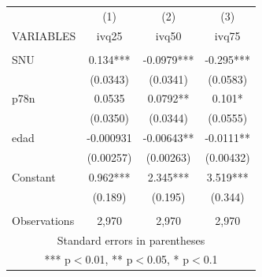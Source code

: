 \begin{tabular}{lccc} \hline
 & (1) & (2) & (3) \\
VARIABLES & ivq25 & ivq50 & ivq75 \\ \hline
 &  &  &  \\
SNU & 0.134*** & -0.0979*** & -0.295*** \\
 & (0.0343) & (0.0341) & (0.0583) \\
p78n & 0.0535 & 0.0792** & 0.101* \\
 & (0.0350) & (0.0344) & (0.0555) \\
edad & -0.000931 & -0.00643** & -0.0111** \\
 & (0.00257) & (0.00263) & (0.00432) \\
Constant & 0.962*** & 2.345*** & 3.519*** \\
 & (0.189) & (0.195) & (0.344) \\
 &  &  &  \\
 Observations & 2,970 & 2,970 & 2,970 \\ \hline
\multicolumn{4}{c}{ Standard errors in parentheses} \\
\multicolumn{4}{c}{ *** p$<$0.01, ** p$<$0.05, * p$<$0.1} \\
\end{tabular}
